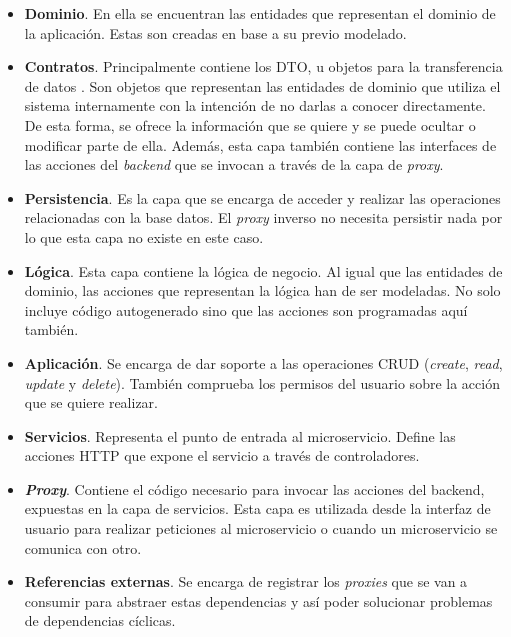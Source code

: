 \documentclass[11pt,spanish,listoffigures]{tfgetsinf}
\begin{document}
\begin{itemize}

	\item \textbf{Dominio}. En ella se encuentran las entidades que representan el dominio de la aplicación. Estas son creadas en base a su previo modelado.

	\item \textbf{Contratos}. Principalmente contiene los DTO, u objetos para la transferencia de datos \cite{DTO}. Son objetos que representan las entidades de dominio que utiliza el sistema internamente con la intención de no darlas a conocer directamente. De esta forma, se ofrece la información que se quiere y se puede ocultar o modificar parte de ella. Además, esta capa también contiene las interfaces de las acciones del \emph{backend} que se invocan a través de la capa de \emph{proxy}.

	\item \textbf{Persistencia}. Es la capa que se encarga de acceder y realizar las operaciones relacionadas con la base datos. El \emph{proxy} inverso no necesita persistir nada por lo que esta capa no existe en este caso.

	\item \textbf{Lógica}. Esta capa contiene la lógica de negocio. Al igual que las entidades de dominio, las acciones que representan la lógica han de ser modeladas. No solo incluye código autogenerado sino que las acciones son programadas aquí también.

	\item \textbf{Aplicación}. Se encarga de dar soporte a las operaciones CRUD (\emph{create}, \emph{read}, \emph{update} y \emph{delete}). También comprueba los permisos del usuario sobre la acción que se quiere realizar.

	\item \textbf{Servicios}. Representa el punto de entrada al microservicio. Define las acciones HTTP que expone el servicio a través de controladores.

	\item \textbf{\emph{Proxy}}. Contiene el código necesario para invocar las acciones del backend, expuestas en la capa de servicios. Esta capa es utilizada desde la interfaz de usuario para realizar peticiones al microservicio o cuando un microservicio se comunica con otro.

	\item \textbf{Referencias externas}. Se encarga de registrar los \emph{proxies} que se van a consumir para abstraer estas dependencias y así poder solucionar problemas de dependencias cíclicas.

\end{itemize}
\end{document}
